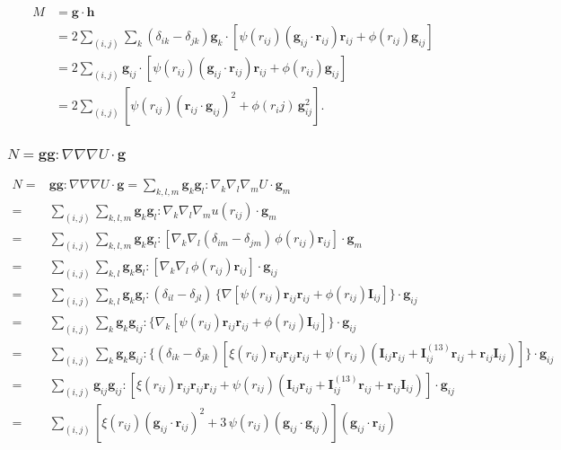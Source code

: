 \documentclass{article}
\begin{document}
\begin{align*}
M &= \mathbf g \cdot \mathbf h
\\
  &= 2 \sum_{(i, j)} \sum_k (\delta_{ik} - \delta_{jk}) 
    \mathbf g_k \cdot [\psi(r_{ij}) (\mathbf g_{ij} \cdot \mathbf r_{ij}) \mathbf r_{ij}
    + \phi(r_{ij}) \mathbf g_{ij}]
\\
  &= 2 \sum_{(i, j)} 
    \mathbf g_{ij} \cdot [\psi(r_{ij}) (\mathbf g_{ij} \cdot \mathbf r_{ij}) \mathbf r_{ij}
    + \phi(r_{ij}) \mathbf g_{ij}]
\\
  &= 2 \sum_{(i, j)} 
    [\psi(r_{ij}) (\mathbf r_{ij} \cdot \mathbf g_{ij})^2 + \phi(r_ij)\, \mathbf g_{ij}^2].
\end{align*}



\subsubsection{$N = \mathbf g \mathbf g : \nabla \nabla \nabla U \cdot \mathbf g$}

\begin{align*}
N =& \mathbf g \mathbf g : \nabla \nabla \nabla U \cdot \mathbf g
  = \sum_{k, l, m} \mathbf g_k \mathbf g_l : \nabla_k \nabla_l \nabla_m U \cdot \mathbf g_m
\\
  =& \sum_{(i, j)} \sum_{k, l, m} \mathbf g_k \mathbf g_l : \nabla_k \nabla_l \nabla_m u(r_{ij}) \cdot \mathbf g_m
\\
  =& \sum_{(i, j)} \sum_{k, l, m} \mathbf g_k \mathbf g_l : [\nabla_k \nabla_l
    (\delta_{im} - \delta_{jm}) \, \phi(r_{ij}) \mathbf r_{ij}] \cdot \mathbf g_m
\\
  =& \sum_{(i, j)} \sum_{k, l} \mathbf g_k \mathbf g_l : [\nabla_k \nabla_l 
    \, \phi(r_{ij}) \mathbf r_{ij}] \cdot \mathbf g_{ij}
\\
  =& \sum_{(i, j)} \sum_{k, l} \mathbf g_k \mathbf g_l : 
    (\delta_{il} - \delta_{jl}) \, 
    \{
    \nabla [\psi(r_{ij}) \mathbf r_{ij} \mathbf r_{ij}
    + \phi(r_{ij}) \mathbf I_{ij}] 
    \}
  \cdot \mathbf g_{ij}
\\
  =& \sum_{(i, j)} \sum_k \mathbf g_k \mathbf g_{ij} : 
    \{
    \nabla_k [\psi(r_{ij}) \mathbf r_{ij} \mathbf r_{ij}
    + \phi(r_{ij}) \mathbf I_{ij}] 
    \}
  \cdot \mathbf g_{ij}
\\
  =& \sum_{(i, j)} \sum_k \mathbf g_k \mathbf g_{ij} : 
    \{
    (\delta_{ik} - \delta_{jk}) 
    [
    \xi(r_{ij}) \mathbf r_{ij} \mathbf r_{ij} \mathbf r_{ij}
   + \psi(r_{ij}) (\mathbf I_{ij} \mathbf r_{ij}
    + \mathbf I_{ij}^{(13)} \mathbf r_{ij}
    + \mathbf r_{ij} \mathbf I_{ij} ) ] 
    \}
  \cdot \mathbf g_{ij}
\\
  =& \sum_{(i, j)} \mathbf g_{ij} \mathbf g_{ij} : 
    [
    \xi(r_{ij}) \mathbf r_{ij} \mathbf r_{ij} \mathbf r_{ij}
    + \psi(r_{ij}) (\mathbf I_{ij} \mathbf r_{ij}
    + \mathbf I_{ij}^{(13)} \mathbf r_{ij}
    +  \mathbf r_{ij} \mathbf I_{ij})] 
  \cdot \mathbf g_{ij}
\\
  =& \sum_{(i, j)} [
    \xi(r_{ij}) (\mathbf g_{ij} \cdot \mathbf r_{ij})^2
    + 3 \, \psi(r_{ij}) (\mathbf g_{ij} \cdot \mathbf g_{ij})] (\mathbf g_{ij} \cdot \mathbf r_{ij}) 
\end{align*}
\end{document}
